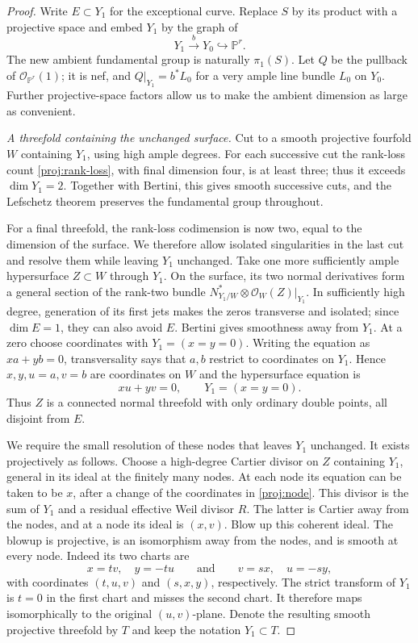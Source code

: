 \documentclass[11pt,reqno]{amsart}
\numberwithin{equation}{section}
\theoremstyle{definition}
\theoremstyle{remark}
\newcommand{\PP}{\mathbb P}
\begin{document}
\begin{proof}
Write $E\subset Y_1$ for the exceptional curve.  Replace $S$ by its
product with a projective space and embed $Y_1$ by the graph of
\[
 Y_1\xrightarrow{b}Y_0\hookrightarrow\PP^r.
\]
The new ambient fundamental group is naturally $\pi_1(S)$.  Let $Q$
be the pullback of $\mathcal O_{\PP^r}(1)$; it is nef, and
$Q|_{Y_1}=b^*L_0$ for a very ample line bundle $L_0$ on $Y_0$.
Further projective-space factors allow us to make the ambient dimension
as large as convenient.

\smallskip
\noindent\emph{A threefold containing the unchanged surface.}
Cut to a smooth projective fourfold $W$ containing $Y_1$, using high
ample degrees.  For each successive cut the rank-loss count
\eqref{proj:rank-loss}, with final dimension four, is at least three;
thus it exceeds $\dim Y_1=2$.  Together with Bertini, this gives smooth
successive cuts, and the Lefschetz theorem preserves the fundamental
group throughout.

For a final threefold, the rank-loss codimension is now two, equal to
the dimension of the surface.  We therefore allow isolated singularities
in the last cut and resolve them while leaving $Y_1$ unchanged.
Take one more sufficiently ample hypersurface $Z\subset W$ through
$Y_1$.  On the surface, its two normal derivatives form a general
section of the rank-two bundle
$N^*_{Y_1/W}\otimes\mathcal O_W(Z)|_{Y_1}$.  In sufficiently high
degree, generation of its first jets makes the zeros transverse and
isolated; since $\dim E=1$, they can also avoid $E$.  Bertini gives
smoothness away from $Y_1$.  At a zero choose coordinates with
$Y_1=(x=y=0)$.  Writing the equation as $xa+yb=0$, transversality says
that $a,b$ restrict to coordinates on $Y_1$.  Hence $x,y,u=a,v=b$ are
coordinates on $W$ and the hypersurface equation is
\begin{equation}\label{proj:node}
 xu+yv=0,\qquad Y_1=(x=y=0).
\end{equation}
Thus $Z$ is a connected normal threefold with only ordinary double
points, all disjoint from $E$.

We require the small resolution of these nodes that leaves $Y_1$
unchanged.  It exists projectively as follows.  Choose a high-degree
Cartier divisor on $Z$ containing $Y_1$, general in its ideal at the
finitely many nodes.  At each node its equation can be taken to be
$x$, after a change of the coordinates in \eqref{proj:node}.  This
divisor is the sum of $Y_1$ and a residual effective Weil divisor $R$.
The latter is Cartier away from the nodes, and at a node its ideal is
$(x,v)$.  Blow up this coherent ideal.  The blowup is projective, is an
isomorphism away from the nodes, and is smooth at every node.  Indeed
its two charts are
\[
 x=tv,\quad y=-tu
 \qquad\text{and}\qquad
 v=sx,\quad u=-sy,
\]
with coordinates $(t,u,v)$ and $(s,x,y)$, respectively.  The strict
transform of $Y_1$ is $t=0$ in the first chart and misses the second
chart.  It therefore maps isomorphically to the original $(u,v)$-plane.
Denote the resulting smooth projective threefold by $T$ and keep the
notation $Y_1\subset T$.


\end{proof}
\end{document}
